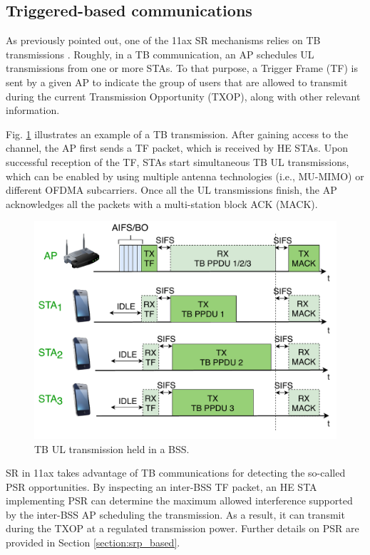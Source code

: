 \documentclass{ieeeaccess}
\begin{document}
\subsection{Triggered-based communications}
\label{section:tb_communication}
As previously pointed out, one of the 11ax SR mechanisms relies on TB transmissions \cite{bellalta2019ap}. Roughly, in a TB communication, an AP schedules UL transmissions from one or more STAs. To that purpose, a Trigger Frame (TF) is sent by a given AP to indicate the group of users that are allowed to transmit during the current Transmission Opportunity (TXOP), along with other relevant information. 

Fig. \ref{fig:TB_transmission_example} illustrates an example of a TB transmission. After gaining access to the channel, the AP first sends a TF packet, which is received by HE STAs. Upon successful reception of the TF, STAs start simultaneous TB UL transmissions, which can be enabled by using multiple antenna technologies (i.e., MU-MIMO) or different OFDMA subcarriers. Once all the UL transmissions finish, the AP acknowledges all the packets with a multi-station block ACK (MACK).

\begin{figure}[ht!]
	\centering
	\includegraphics[width=.95\columnwidth]{fig_8}
	\caption{TB UL transmission held in a BSS.}
	\label{fig:TB_transmission_example}
\end{figure}

SR in 11ax takes advantage of TB communications for detecting the so-called PSR opportunities. By inspecting an inter-BSS TF packet, an HE STA implementing PSR can determine the maximum allowed interference supported by the inter-BSS AP scheduling the transmission. As a result, it can transmit during the TXOP at a regulated transmission power. Further details on PSR are provided in Section \ref{section:srp_based}.
\end{document}
